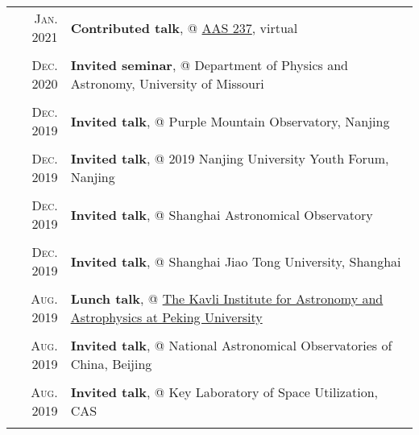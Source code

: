 \documentclass[letterpaper,10pt]{article}
\newcommand{\textwrap}{5.8in}       %
\begin{document}
\begin{longtable}{r|p{\textwrap}}

    \textsc{Jan. 2021}   &   \textbf{Contributed talk}, @ \href{https://aas.org/meetings/aas237}{AAS 237}, virtual    \\
    \multicolumn{2}{c}{} \\

    \textsc{Dec. 2020}   &   \textbf{Invited seminar}, @ Department of Physics and Astronomy, University of Missouri \\
    \multicolumn{2}{c}{} \\

    \textsc{Dec. 2019}   &   \textbf{Invited talk}, @ Purple Mountain Observatory, Nanjing \\
    \multicolumn{2}{c}{} \\

    \textsc{Dec. 2019}   &   \textbf{Invited talk}, @ 2019 Nanjing University Youth Forum, Nanjing \\
    \multicolumn{2}{c}{} \\

    \textsc{Dec. 2019}   &   \textbf{Invited talk}, @ Shanghai Astronomical Observatory \\
    \multicolumn{2}{c}{} \\

    \textsc{Dec. 2019}   &   \textbf{Invited talk}, @ Shanghai Jiao Tong University, Shanghai \\
    \multicolumn{2}{c}{} \\

    \textsc{Aug. 2019}   &   \textbf{Lunch talk}, @ \href{http://kiaa.pku.edu.cn/info/1025/5076.htm}{The Kavli Institute for 
    Astronomy and Astrophysics at Peking University} \\
    \multicolumn{2}{c}{} \\

    \textsc{Aug. 2019}   &   \textbf{Invited talk}, @ National Astronomical Observatories of China, Beijing \\
    \multicolumn{2}{c}{} \\

    \textsc{Aug. 2019}   &   \textbf{Invited talk}, @ Key Laboratory of Space Utilization, CAS \\
    \multicolumn{2}{c}{} \\


\end{longtable}
\end{document}
